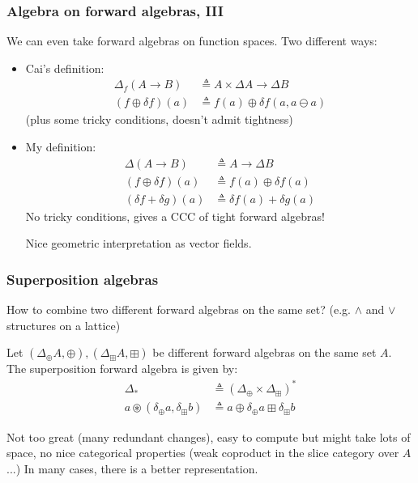 \documentclass[english]{beamer}
\theoremstyle{plain}
\theoremstyle{remark}
\theoremstyle{remark}
\theoremstyle{remark}
\theoremstyle{definition}
\theoremstyle{definition}
\newcommand{\ra}[0]{\rightarrow}
\newcommand{\defeq}[0]{\triangleq}
\begin{document}
\begin{frame}
  \frametitle{Algebra on forward algebras, III}
  We can even take forward algebras on function spaces.
  \vfill
  Two different ways:
  \begin{itemize}
  \item Cai's definition:
    \begin{align*}
      \Delta_f (A \ra B) &\defeq A \times \Delta A \ra \Delta B\\
      (f \oplus \delta f)(a) &\defeq f(a) \oplus \delta f (a, a \ominus a)
    \end{align*}
    (plus some tricky conditions, doesn't admit tightness)
  \item My definition:
    \begin{align*}
      \Delta (A \ra B) &\defeq A \ra \Delta B\\
      (f \oplus \delta f)(a) &\defeq f(a) \oplus \delta f(a)\\
      (\delta f + \delta g)(a) &\defeq \delta f(a) + \delta g(a)
    \end{align*}
    No tricky conditions, gives a CCC of tight forward algebras!

    Nice geometric interpretation as vector fields.
  \end{itemize}
\end{frame}

\newcommand{\cast}[0]{\circledast}
\begin{frame}
\frametitle{Superposition algebras}
How to combine two different forward algebras on the same set? (e.g. $\wedge$ and $\vee$ structures
on a lattice)
\vfill
\begin{definition}
  Let $(\Delta_{\oplus} A, \oplus), (\Delta_{\boxplus} A, \boxplus)$ be different forward algebras on
  the same
  set $A$. The superposition forward algebra is given by:
  \begin{align*}
    \Delta_{\ast} &\defeq (\Delta_\oplus \times \Delta_\boxplus)^\ast\\
    a \cast (\delta_\oplus a, \delta_\boxplus b)
    &\defeq a \oplus \delta_\oplus a \boxplus \delta_\boxplus b
  \end{align*}
\end{definition}
\vfill
Not too great (many redundant changes), easy to compute but might take lots of space, no nice
categorical properties (weak coproduct in the slice category over $A$...)
\vfill
In many cases, there is a better representation.
\end{frame}
\end{document}
